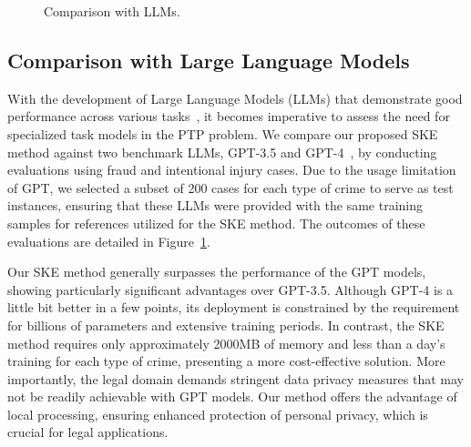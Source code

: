 \begin{figure}[th]
\hspace{0.001\linewidth}
    \vspace{-1em}
\caption{Comparison with LLMs. }
\label{fig:gpt}
\vspace{-1em}
\end{figure}

\vspace{-0.5em}
\subsection{Comparison with Large Language Models}
With the development of Large Language Models (LLMs) that demonstrate good performance across various tasks~\cite{NEURIPS2020_1457c0d6,Katz2023GPT4PT, sun2023short}, it becomes imperative to assess the need for specialized task models in the PTP problem. We compare our proposed SKE method against two benchmark LLMs, GPT-3.5 and GPT-4~\cite{NEURIPS2022_b1efde53,DBLP:journals/corr/abs-2303-08774}, by conducting evaluations using fraud and intentional injury cases. Due to the usage limitation of GPT, we selected a subset of 200 cases for each type of crime to serve as test instances, ensuring that these LLMs were provided with the same training samples for references utilized for the SKE method. The outcomes of these evaluations are detailed in Figure~\ref{fig:gpt}.

Our SKE method generally surpasses the performance of the GPT models, showing particularly significant advantages over GPT-3.5. Although GPT-4 is a little bit better in a few points, its deployment is constrained by the requirement for billions of parameters and extensive training periods. In contrast, the SKE method requires only approximately 2000MB of memory and less than a day's training for each type of crime, presenting a more cost-effective solution. More importantly, the legal domain demands stringent data privacy measures that may not be readily achievable with GPT models. Our method offers the advantage of local processing, ensuring enhanced protection of personal privacy, which is crucial for legal applications.


